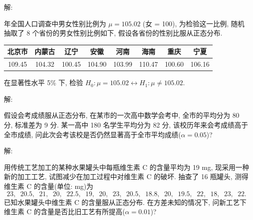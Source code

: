 \documentclass[standard]{ExBook}
\begin{document}
\begin{qitems}
\vspace{-5em}

    \begin{bbox}
解: 
    \end{bbox}

\vspace{-5em}

    \begin{bbox}
    \begin{shaded}
         年全国人口调查中男女性别比例为 $\mu = 105.02$ (女 = 100), 为检验这一比例, 随机抽取了 8 个省份的男女性别比例如下, 假设各省份的性别比服从正态分布.
\begin{center}
\setlength{\tabcolsep}{14pt}
\begin{tabular}{cccccccc}
\hline
北京市 & 内蒙古 & 辽宁 & 安徽 & 河南 & 海南 & 重庆 & 宁夏 \\
\hline
109.45 & 104.32 & 100.45 & 104.90 & 103.99 & 110.47 & 100.60 & 106.16 \\
\hline
\end{tabular}
\end{center}
在显著性水平 5\% 下, 检验 $H_0 : \mu = 105.02 \longleftrightarrow H_1 : \mu \neq 105.02$.
    \end{shaded}
    \end{bbox}

\vspace{-5em}

    \begin{bbox}
解: 
    \end{bbox}

\vspace{-5em}

    \begin{bbox}
    \begin{shaded}
        \qitem
假设会考成绩服从正态分布, 在某市的一次高中数学会考中, 全市的平均分为 80 分, 标准差为 9 分. 某一高中 180 名学生平均分为 82 分, 该校历年来会考成绩高于全市成绩, 问此次会考该校是否仍然显著高于全市平均成绩($\alpha=0.05$)?
    \end{shaded}
    \end{bbox}

\vspace{-5em}

    \begin{bbox}
解: 
    \end{bbox}

\vspace{-5em}

    \begin{bbox}
    \begin{shaded}
        \qitem
用传统工艺加工的某种水果罐头中每瓶维生素 C 的含量平均为 19 mg, 现采用一种新的加工工艺, 试图减少在加工过程中对维生素 C 的破坏. 抽查了 16 瓶罐头, 测得维生素 C 的含量(单位: mg)为
$$23, \;\; 20.5, \;\; 21, \;\; 20, \;\; 22.5, \;\; 19, \;\; 20, \;\; 23, \;\; 20.5, \;\; 18.8, \;\; 20, \;\; 19.5, \;\; 22, \;\; 18, \;\; 23, \;\; 22.$$
已知水果罐头中维生素 C 的含量服从正态分布. 在方差未知的情况下, 问新工艺下维生素 C 的含量是否比旧工艺有所提高($\alpha=0.01$)?
    \end{shaded}
    \end{bbox}


\end{qitems}
\end{document}
